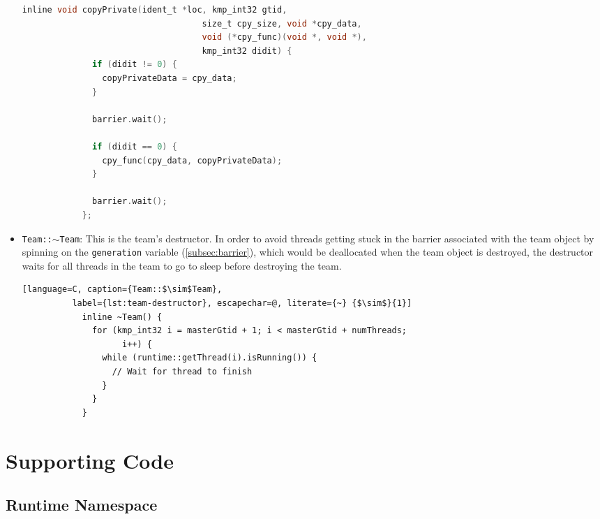 \begin{itemize}
	      \begin{lstlisting}[language=C, caption={void Team::copyprivate},
          label={lst:team-copyprivate}, escapechar=@]
            inline void copyPrivate(ident_t *loc, kmp_int32 gtid,
                                    size_t cpy_size, void *cpy_data,
                                    void (*cpy_func)(void *, void *),
                                    kmp_int32 didit) {
              if (didit != 0) {
                copyPrivateData = cpy_data;
              }

              barrier.wait();

              if (didit == 0) {
                cpy_func(cpy_data, copyPrivateData);
              }

              barrier.wait();
            };
          \end{lstlisting}

	\item \texttt{Team::$\sim$Team}: This is the team's destructor. In order to avoid threads
	      getting stuck in the barrier associated with the team object by spinning on the
	      \texttt{generation} variable (\cref{subsec:barrier}), which would be deallocated when the team
	      object is destroyed, the destructor waits for all threads in the team to go to sleep before
	      destroying the team.

	      \begin{lstlisting}[language=C, caption={Team::$\sim$Team},
          label={lst:team-destructor}, escapechar=@, literate={~} {$\sim$}{1}]
            inline ~Team() {
              for (kmp_int32 i = masterGtid + 1; i < masterGtid + numThreads;
                    i++) {
                while (runtime::getThread(i).isRunning()) {
                  // Wait for thread to finish
                }
              }
            }
          \end{lstlisting}

\end{itemize}

\section{Supporting Code}
\label{sec:supporting-code}

\subsection{Runtime Namespace}
\label{subsec:runtime-namespace}

